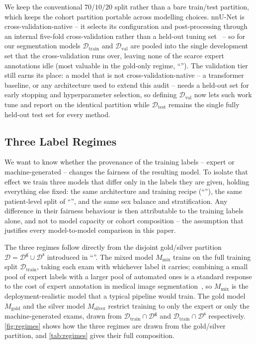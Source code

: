 We keep the conventional $70/10/20$ split rather than a bare train/test partition, which
keeps the cohort partition portable across modelling choices. nnU-Net is
cross-validation-native -- it selects its configuration and post-processing through an
internal five-fold cross-validation rather than a held-out tuning
set~\cite{isensee2021nnunet} -- so for our segmentation models $\mathcal{D}_{\mathrm{train}}$
and $\mathcal{D}_{\mathrm{val}}$ are pooled into the single development set that the
cross-validation runs over, leaving none of the scarce expert annotations idle (most
valuable in the gold-only regime, ``''). The validation tier still
earns its place: a model that is not cross-validation-native -- a transformer baseline, or
any architecture used to extend this audit -- needs a held-out set for early stopping and
hyperparameter selection, so defining $\mathcal{D}_{\mathrm{val}}$ now lets such work tune
and report on the identical partition while $\mathcal{D}_{\mathrm{test}}$ remains the single
fully held-out test set for every method.

\subsection{Three Label Regimes}
\label{sec:regimes}

We want to know whether the provenance of the training labels -- expert
or machine-generated -- changes the fairness of the resulting model. To isolate
that effect we train three models that differ only in the labels they are given,
holding everything else fixed: the same architecture and training recipe
(``''), the same patient-level split of
``'', and the same sex balance and stratification. Any
difference in their fairness behaviour is then attributable to the training
labels alone, and not to model capacity or cohort composition -- the assumption
that justifies every model-to-model comparison in this paper.

The three regimes follow directly from the disjoint gold/silver partition
$\mathcal{D} = \mathcal{D}^{\mathsf{g}} \cup \mathcal{D}^{\mathsf{s}}$ introduced
in ``''. The mixed model $M_{\mathrm{mix}}$ trains on the
full training split $\mathcal{D}_{\mathrm{train}}$, taking each exam with
whichever label it carries; combining a small pool of expert labels with a
larger pool of automated ones is a standard response to the cost of expert
annotation in medical image segmentation~\cite{tajbakhsh2020embracing}, so
$M_{\mathrm{mix}}$ is the deployment-realistic model that a typical pipeline
would train. The
gold model $M_{\mathrm{gold}}$ and the silver model $M_{\mathrm{silver}}$
restrict training to only the expert or only the machine-generated exams, drawn
from $\mathcal{D}_{\mathrm{train}} \cap \mathcal{D}^{\mathsf{g}}$ and
$\mathcal{D}_{\mathrm{train}} \cap \mathcal{D}^{\mathsf{s}}$ respectively.
\autoref{fig:regimes} shows how the three regimes are drawn from the gold/silver
partition, and \autoref{tab:regimes} gives their full composition.

